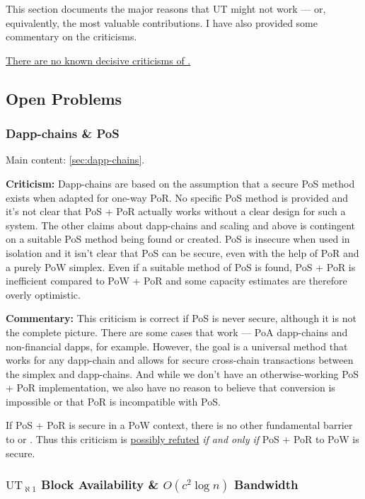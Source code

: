 This section documents the major reasons that UT might not work --- or, equivalently, the most valuable contributions.
I have also provided some commentary on the criticisms.

\ul{There are no known decisive criticisms of .}

\subsection{Open Problems}

\subsubsection{Dapp-chains \& PoS}

Main content: \autoref{sec:dapp-chains}.

\textbf{Criticism:}
Dapp-chains are based on the assumption that a secure PoS method exists when adapted for one-way PoR.
No specific PoS method is provided and it's not clear that PoS + PoR actually works without a clear design for such a system.
The other claims about dapp-chains and  scaling and above is contingent on a suitable PoS method being found or created.
PoS is insecure when used in isolation and it isn't clear that PoS can be secure, even with the help of PoR and a purely PoW simplex.
Even if a suitable method of PoS is found, PoS + PoR is inefficient compared to PoW + PoR and some capacity estimates are therefore overly optimistic.

\textbf{Commentary:}
This criticism is correct if PoS is never secure, although it is not the complete picture.
There are some cases that work --- PoA dapp-chains and non-financial dapps, for example.
However, the goal is a universal method that works for any dapp-chain and allows for secure cross-chain transactions between the simplex and dapp-chains.
And while we don't have an otherwise-working PoS + PoR implementation, we also have no reason to believe that conversion is impossible or that PoR is incompatible with PoS.

If PoS + PoR is secure in a PoW context, there is no other fundamental barrier to  or .
Thus this criticism is \ul{possibly refuted} \emph{if and only if} PoS + PoR to PoW is secure.

\subsubsection{\texorpdfstring{$\text{UT}_{\aleph 1}$ Block Availability \& $O(c^2 \log n)$ Bandwidth}{UTℵ Block Availability & O(c² log n) Bandwidth}}

